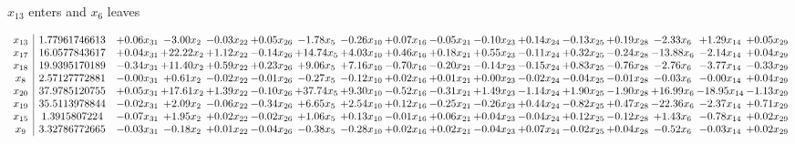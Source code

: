 \documentclass[9pt]{article}
\begin{document}
 $ x_{13} $ enters and $ x_{6} $ leaves 

 \[\begin{array}{c| c c@{\hskip 2pt} c@{\hskip 2pt} c@{\hskip 2pt} c@{\hskip 2pt} c@{\hskip 2pt} c@{\hskip 2pt} c@{\hskip 2pt} c@{\hskip 2pt} c@{\hskip 2pt} c@{\hskip 2pt} c@{\hskip 2pt} c@{\hskip 2pt} c@{\hskip 2pt} c@{\hskip 2pt} c@{\hskip 2pt} }
 x_{13}   &  1.77961746613 & +  0.06 x_{31} & -3.00 x_{2} & -0.03 x_{22} & +  0.05 x_{26} & -1.78 x_{5} & -0.26 x_{10} & +  0.07 x_{16} & -0.05 x_{21} & -0.10 x_{23} & +  0.14 x_{24} & -0.13 x_{25} & +  0.19 x_{28} & -2.33 x_{6} & +  1.29 x_{14} & +  0.05 x_{29}\\
 x_{17}   &  16.0577843617 & +  0.04 x_{31} & + 22.22 x_{2} & +  1.12 x_{22} & -0.14 x_{26} & + 14.74 x_{5} & +  4.03 x_{10} & +  0.46 x_{16} & +  0.18 x_{21} & +  0.55 x_{23} & -0.11 x_{24} & +  0.32 x_{25} & -0.24 x_{28} & -13.88 x_{6} & -2.14 x_{14} & +  0.04 x_{29}\\
 x_{18}   &  19.9395170189 & -0.34 x_{31} & + 11.40 x_{2} & +  0.59 x_{22} & +  0.23 x_{26} & +  9.06 x_{5} & +  7.16 x_{10} & -0.70 x_{16} & -0.20 x_{21} & -0.14 x_{23} & -0.15 x_{24} & +  0.83 x_{25} & -0.76 x_{28} & -2.76 x_{6} & -3.77 x_{14} & -0.33 x_{29}\\
 x_{8}   &  2.57127772881 & -0.00 x_{31} & +  0.61 x_{2} & -0.02 x_{22} & -0.01 x_{26} & -0.27 x_{5} & -0.12 x_{10} & +  0.02 x_{16} & +  0.01 x_{21} & +  0.00 x_{23} & -0.02 x_{24} & -0.04 x_{25} & -0.01 x_{28} & -0.03 x_{6} & -0.00 x_{14} & +  0.04 x_{29}\\
 x_{20}   &  37.9785120755 & +  0.05 x_{31} & + 17.61 x_{2} & +  1.39 x_{22} & -0.10 x_{26} & + 37.74 x_{5} & +  9.30 x_{10} & -0.52 x_{16} & -0.31 x_{21} & +  1.49 x_{23} & -1.14 x_{24} & +  1.90 x_{25} & -1.90 x_{28} & + 16.99 x_{6} & -18.95 x_{14} & -1.13 x_{29}\\
 x_{19}   &  35.5113978844 & -0.02 x_{31} & +  2.09 x_{2} & -0.06 x_{22} & -0.34 x_{26} & +  6.65 x_{5} & +  2.54 x_{10} & +  0.12 x_{16} & -0.25 x_{21} & -0.26 x_{23} & +  0.44 x_{24} & -0.82 x_{25} & +  0.47 x_{28} & -22.36 x_{6} & -2.37 x_{14} & +  0.71 x_{29}\\
 x_{15}   &  1.3915807224 & -0.07 x_{31} & +  1.95 x_{2} & +  0.02 x_{22} & -0.02 x_{26} & +  1.06 x_{5} & +  0.13 x_{10} & -0.01 x_{16} & +  0.06 x_{21} & +  0.04 x_{23} & -0.04 x_{24} & +  0.12 x_{25} & -0.12 x_{28} & +  1.43 x_{6} & -0.78 x_{14} & +  0.02 x_{29}\\
 x_{9}   &  3.32786772665 & -0.03 x_{31} & -0.18 x_{2} & +  0.01 x_{22} & -0.04 x_{26} & -0.38 x_{5} & -0.28 x_{10} & +  0.02 x_{16} & +  0.02 x_{21} & -0.04 x_{23} & +  0.07 x_{24} & -0.02 x_{25} & +  0.04 x_{28} & -0.52 x_{6} & -0.03 x_{14} & +  0.02 x_{29}\\

\end{array}\]
\end{document}
